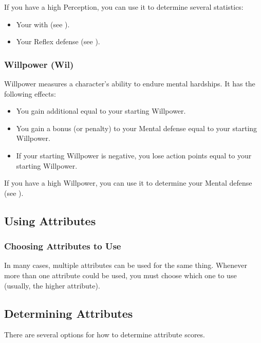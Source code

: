             If you have a high Perception, you can use it to determine several statistics:
            \begin{itemize}
                \item Your  with  (see ).
                \item Your Reflex defense (see ).
            \end{itemize}

        \subsubsection{Willpower (Wil)}\label{Willpower}
            Willpower measures a character's ability to endure mental hardships.
            It has the following effects:
            \begin{itemize}
                \item You gain additional  equal to your starting Willpower.
                \item You gain a bonus (or penalty) to your Mental defense equal to your starting Willpower.
                \item If your starting Willpower is negative, you lose action points equal to your starting Willpower.
            \end{itemize}

            If you have a high Willpower, you can use it to determine your Mental defense (see ).

    \subsection{Using Attributes}

        \subsubsection{Choosing Attributes to Use}
            In many cases, multiple attributes can be used for the same thing.
            Whenever more than one attribute could be used, you must choose which one to use (usually, the higher attribute).

    \subsection{Determining Attributes}
        There are several options for how to determine attribute scores.

